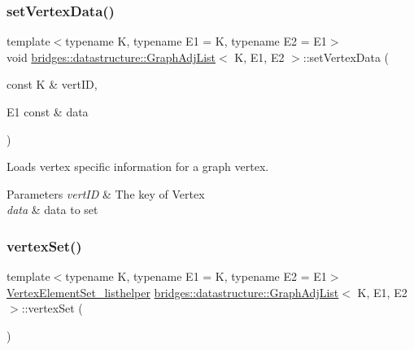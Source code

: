 \subsubsection{\texorpdfstring{set\+Vertex\+Data()}{setVertexData()}}
{\footnotesize\ttfamily template$<$typename K, typename E1 = K, typename E2 = E1$>$ \\
void \hyperlink{classbridges_1_1datastructure_1_1_graph_adj_list}{bridges\+::datastructure\+::\+Graph\+Adj\+List}$<$ K, E1, E2 $>$\+::set\+Vertex\+Data (\begin{DoxyParamCaption}\item[{const K \&}]{vert\+ID,  }\item[{E1 const \&}]{data }\end{DoxyParamCaption})\hspace{0.3cm}{\ttfamily [inline]}}



Loads vertex specific information for a graph vertex. 


\begin{DoxyParams}{Parameters}
{\em vert\+ID} & The key of Vertex \\
\hline
{\em data} & data to set \\
\hline
\end{DoxyParams}
\mbox{\label{classbridges_1_1datastructure_1_1_graph_adj_list_a9dcf0bb4a68f3b02281c84e9bb69d6b3}} 
\subsubsection{\texorpdfstring{vertex\+Set()}{vertexSet()}\hspace{0.1cm}{\footnotesize\ttfamily [1/2]}}
{\footnotesize\ttfamily template$<$typename K, typename E1 = K, typename E2 = E1$>$ \\
\hyperlink{classbridges_1_1datastructure_1_1_graph_adj_list_1_1_vertex_element_set__listhelper}{Vertex\+Element\+Set\+\_\+listhelper} \hyperlink{classbridges_1_1datastructure_1_1_graph_adj_list}{bridges\+::datastructure\+::\+Graph\+Adj\+List}$<$ K, E1, E2 $>$\+::vertex\+Set (\begin{DoxyParamCaption}{ }\end{DoxyParamCaption})\hspace{0.3cm}{\ttfamily [inline]}}


